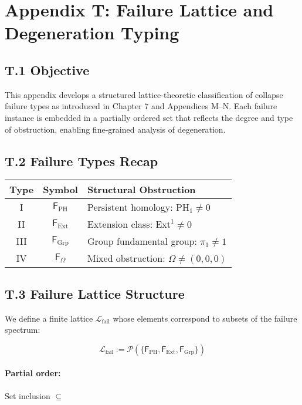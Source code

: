 \documentclass[11pt]{article}
\begin{document}
\section*{Appendix T: Failure Lattice and Degeneration Typing}

\subsection*{T.1 Objective}

This appendix develops a structured lattice-theoretic classification of collapse failure types as introduced in Chapter 7 and Appendices M–N. Each failure instance is embedded in a partially ordered set that reflects the degree and type of obstruction, enabling fine-grained analysis of degeneration.

\subsection*{T.2 Failure Types Recap}

\begin{center}
\begin{tabular}{|c|c|l|}
\hline
Type & Symbol & Structural Obstruction \\
\hline
I & \( \mathsf{F}_\mathrm{PH} \) & Persistent homology: \( \mathrm{PH}_1 \ne 0 \) \\
II & \( \mathsf{F}_\mathrm{Ext} \) & Extension class: \( \mathrm{Ext}^1 \ne 0 \) \\
III & \( \mathsf{F}_\mathrm{Grp} \) & Group fundamental group: \( \pi_1 \ne 1 \) \\
IV & \( \mathsf{F}_\Omega \) & Mixed obstruction: \( \Omega \ne (0,0,0) \) \\
\hline
\end{tabular}
\end{center}

\subsection*{T.3 Failure Lattice Structure}

We define a finite lattice \( \mathcal{L}_\mathrm{fail} \) whose elements correspond to subsets of the failure spectrum:

\[
\mathcal{L}_\mathrm{fail} := \mathcal{P}(\{\mathsf{F}_\mathrm{PH}, \mathsf{F}_\mathrm{Ext}, \mathsf{F}_\mathrm{Grp}\})
\]

\paragraph{Partial order:} Set inclusion \( \subseteq \)
\end{document}
